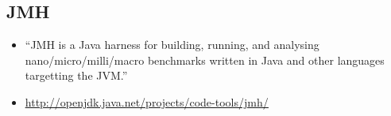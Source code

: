 \documentclass[unicode]{beamer}
\begin{document}
\subsection{JMH}

\begin{frame}
\begin{itemize}
\item ``JMH is a Java harness for building, running, and analysing
    nano/micro/milli/macro benchmarks written in Java and other
    languages targetting the JVM.''
    \bigskip
\item \underline{\url{http://openjdk.java.net/projects/code-tools/jmh/}}
\end{itemize}
\end{frame}
\end{document}
